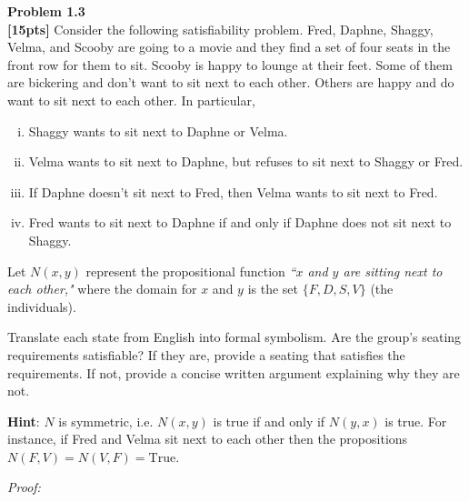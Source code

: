 \documentclass{article}
\newenvironment{problem}[2][Problem]
    { \begin{mdframed}[backgroundcolor=gray!20] \textbf{#1 #2} \\}
    {  \end{mdframed}}
\newenvironment{solution}
    {\textit{Proof:}}
    {}
\begin{document}
\begin{problem}{1.3}
\textbf{[15pts]} Consider the following satisfiability problem. Fred, Daphne, Shaggy, Velma, and Scooby are going to a movie and they find a set of four seats in the front row for them to sit. Scooby is happy to lounge at their feet. Some of them are bickering and don't want to sit next to each other. Others are happy and do want to sit next to each other. In particular, 
\begin{enumerate}[i.]
    \item Shaggy wants to sit next to Daphne or Velma.
    \item Velma wants to sit next to Daphne, but refuses to sit next to Shaggy or Fred.
    \item If Daphne doesn't sit next to Fred, then Velma wants to sit next to Fred.
    \item Fred wants to sit next to Daphne if and only if Daphne does not sit next to Shaggy.
\end{enumerate}

Let $N(x,y)$ represent the propositional function \textit{``$x$ and $y$ are sitting next to each other,"} where the domain for $x$ and $y$ is the set $\{F, D, S, V\}$ (the individuals). 

\vspace{1em}

Translate each state from English into formal symbolism. Are the group's seating requirements satisfiable? If they are, provide a seating that satisfies the requirements. If not, provide a concise written argument explaining why they are not.

\vspace{1em}

\textbf{Hint}: $N$ is symmetric, i.e. $N(x,y)$ is true if and only if $N(y,x)$ is true. For instance, if Fred and Velma sit next to each other then the propositions $N(F, V) = N(V, F) = \text{True}$. 

\end{problem}

\begin{solution}
\end{solution}
\newpage  %
\end{document}
